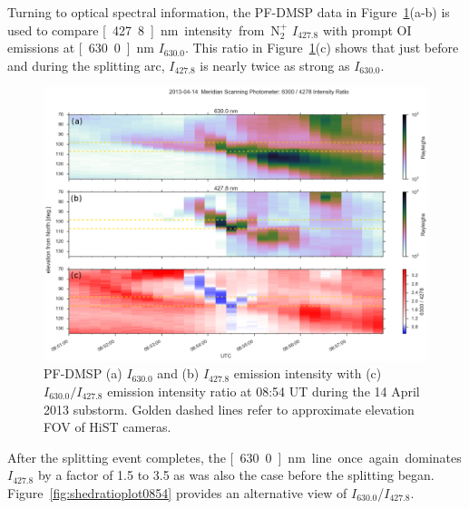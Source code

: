 Turning to optical spectral information, the PF-DMSP data in Figure~\ref{fig:shedratio0854}(a-b) is used to compare \unit[427.8]{nm} intensity from N$_2^+$ $I_{427.8}$ with prompt OI emissions at \unit[630.0]{nm} $I_{630.0}$.
This ratio in Figure~\ref{fig:shedratio0854}(c) shows that just before and during the splitting arc, $I_{427.8}$ is nearly twice as strong as $I_{630.0}$. 
\begin{figure}
    \includegraphics[width=\columnwidth,trim=3 3 3 3,clip]{gfx/2013-04-14T0854/MSPintensityratio}
    \caption{PF-DMSP (a) $I_{630.0}$ and (b) $I_{427.8}$ emission intensity with (c) $I_{630.0}/I_{427.8}$ emission intensity ratio at 08:54 UT during the 14 April 2013 substorm. Golden dashed lines refer to approximate elevation FOV of HiST cameras.}\label{fig:shedratio0854}
\end{figure}
After the splitting event completes, the \unit[630.0]{nm} line once again dominates $I_{427.8}$ by a factor of 1.5 to 3.5 as was also the case before the splitting began.
Figure~\ref{fig:shedratioplot0854} provides an alternative view of $I_{630.0}$/$I_{427.8}$.
